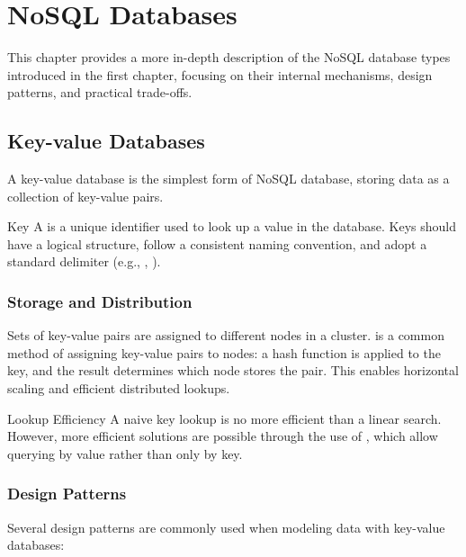 \chapter{NoSQL Databases}

This chapter provides a more in-depth description of the NoSQL database types introduced in the first chapter, focusing on their internal mechanisms, design patterns, and practical trade-offs.

\section{Key-value Databases}

A key-value database is the simplest form of NoSQL database, storing data as a collection of key-value pairs.

\begin{definition}{Key}
A  is a unique identifier used to look up a value in the database. Keys should have a logical structure, follow a consistent naming convention, and adopt a standard delimiter (e.g., , ).
\end{definition}

\subsection{Storage and Distribution}

Sets of key-value pairs are assigned to different nodes in a cluster.  is a common method of assigning key-value pairs to nodes: a hash function is applied to the key, and the result determines which node stores the pair. This enables horizontal scaling and efficient distributed lookups.

\begin{note}{Lookup Efficiency}
    A naive key lookup is no more efficient than a linear search. However, more efficient solutions are possible through the use of , which allow querying by value rather than only by key.
\end{note}

\subsection{Design Patterns}

Several design patterns are commonly used when modeling data with key-value databases:

